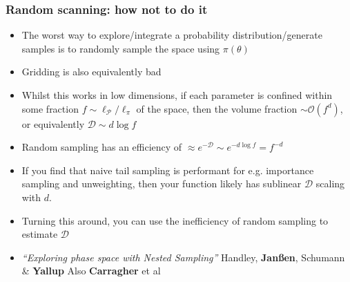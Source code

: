 \documentclass[aspectratio=169]{beamer}
\begin{document}

\begin{frame}
    \frametitle{Random scanning: how not to do it}
    \begin{itemize}
        \item The worst way to explore/integrate a probability distribution/generate samples is to randomly sample the space using $\pi(\theta)$~
        \item Gridding is also equivalently bad
        \item Whilst this works in low dimensions, if each parameter is confined within some fraction $f\sim\ell_\mathcal{P}/\ell_\pi$ of the space, then the volume fraction $\sim\mathcal{O}(f^d)$, or equivalently $\mathcal{D}\sim d\log f$ 
        \item Random sampling has an efficiency of $\boxed{\approx e^{-\mathcal{D}} \sim e^{-d\log f} = f^{-d}}$
        \item If you find that naive tail sampling is performant for e.g. importance sampling and unweighting, then your function likely has sublinear $\mathcal{D}$ scaling with $d$. 
        \item Turning this around, you can use the inefficiency of random sampling to estimate $\mathcal{D}$

        \item \emph{``Exploring phase space with Nested Sampling''} Handley, \textbf{Jan{\ss}en}, Schumann \& \textbf{Yallup} 
            Also \textbf{Carragher} et al~
    \end{itemize}
\end{frame}
\end{document}
